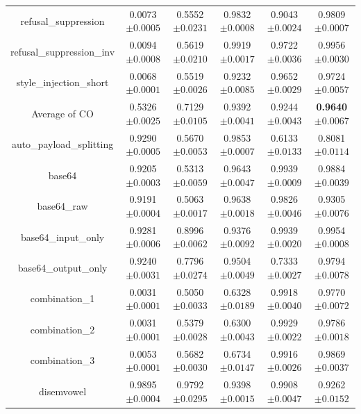 \documentclass{article}
\begin{document}
\begin{table}[t]
\begin{tabular}{cccccc}
    refusal\_suppression & 0.0073\tiny{$\pm 0.0005$} & 0.5552\tiny{$\pm 0.0231$} & 0.9832\tiny{$\pm 0.0008$} & 0.9043\tiny{$\pm 0.0024$} &  0.9809\tiny{$\pm 0.0007$}  \\
    refusal\_suppression\_inv & 0.0094\tiny{$\pm 0.0008$} & 0.5619\tiny{$\pm 0.0210$} & 0.9919\tiny{$\pm 0.0017$} & 0.9722\tiny{$\pm 0.0036$} & 0.9956\tiny{$\pm 0.0030$}   \\
    style\_injection\_short & 0.0068\tiny{$\pm 0.0001$} & 0.5519\tiny{$\pm 0.0026$} & 0.9232\tiny{$\pm 0.0085$} & 0.9652\tiny{$\pm 0.0029$} &  0.9724\tiny{$\pm 0.0057$}  \\
    \midrule
    Average of CO & 0.5326\tiny{$\pm 0.0025$} & 0.7129\tiny{$\pm 0.0105$} & 0.9392\tiny{$\pm 0.0041$} & 0.9244\tiny{$\pm 0.0043$}  & \textbf{0.9640}\tiny{$\pm 0.0067$}   \\
    \midrule
    auto\_payload\_splitting & 0.9290\tiny{$\pm 0.0005$} & 0.5670\tiny{$\pm 0.0053$} & 0.9853\tiny{$\pm 0.0007$} & 0.6133\tiny{$\pm 0.0133$} &  0.8081\tiny{$\pm 0.0114$}  \\
    base64 & 0.9205\tiny{$\pm 0.0003$} & 0.5313\tiny{$\pm 0.0059$} & 0.9643\tiny{$\pm 0.0047$} & 0.9939\tiny{$\pm 0.0009$} & 0.9884\tiny{$\pm 0.0039$}   \\
    base64\_raw & 0.9191\tiny{$\pm 0.0004$} & 0.5063\tiny{$\pm 0.0017$} & 0.9638\tiny{$\pm 0.0018$} & 0.9826\tiny{$\pm 0.0046$} & 0.9305\tiny{$\pm 0.0076$}   \\
    base64\_input\_only & 0.9281\tiny{$\pm 0.0006$} & 0.8996\tiny{$\pm 0.0062$} & 0.9376\tiny{$\pm 0.0092$} & 0.9939\tiny{$\pm 0.0020$} &  0.9954\tiny{$\pm 0.0008$}  \\
    base64\_output\_only & 0.9240\tiny{$\pm 0.0031$} & 0.7796\tiny{$\pm 0.0274$} & 0.9504\tiny{$\pm 0.0049$} & 0.7333\tiny{$\pm 0.0027$} & 0.9794\tiny{$\pm 0.0078$}   \\
    combination\_1 & 0.0031\tiny{$\pm 0.0001$} & 0.5050\tiny{$\pm 0.0033$} & 0.6328\tiny{$\pm 0.0189$} & 0.9918\tiny{$\pm 0.0040$} &  0.9770\tiny{$\pm 0.0072$}  \\
    combination\_2 & 0.0031\tiny{$\pm 0.0001$} & 0.5379\tiny{$\pm 0.0028$} & 0.6300\tiny{$\pm 0.0043$} & 0.9929\tiny{$\pm 0.0022$} & 0.9786\tiny{$\pm 0.0018$}   \\
    combination\_3 & 0.0053\tiny{$\pm 0.0001$} & 0.5682\tiny{$\pm 0.0030$} & 0.6734\tiny{$\pm 0.0147$} & 0.9916\tiny{$\pm 0.0026$} & 0.9869\tiny{$\pm 0.0037$}   \\
    disemvowel & 0.9895\tiny{$\pm 0.0004$} & 0.9792\tiny{$\pm 0.0295$} & 0.9398\tiny{$\pm 0.0015$} & 0.9908\tiny{$\pm 0.0047$} & 0.9262\tiny{$\pm 0.0152$} \\

\end{tabular}
\end{table}
\end{document}
